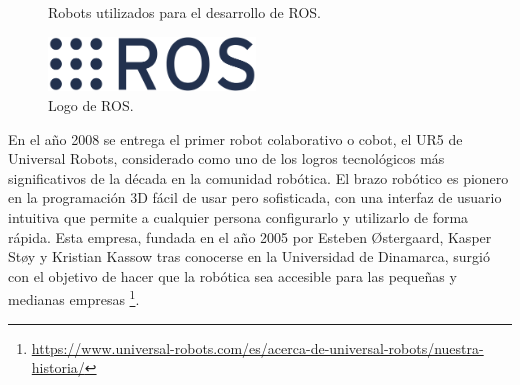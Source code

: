   \begin{figure}[h!]
    \begin{center}
      \subcapcentertrue
      \hspace{2mm}
    \end{center}
    \caption{Robots utilizados para el desarrollo de ROS.}
    \label{fig:PR_ROS}
  \end{figure}
  
  
  \begin{figure} [h!]
    \begin{center}
      \includegraphics[width=55mm]{figs/ROS_logo.png}
    \end{center}
    \caption{Logo de ROS.}
    \label{fig:ROS}
  \end{figure}
  
  \pagebreak
  
En el año 2008 se entrega el primer robot colaborativo o cobot, el UR5 de Universal Robots, considerado como uno de los logros tecnológicos más significativos de la década en la comunidad robótica. El brazo robótico es pionero en la programación 3D fácil de usar pero sofisticada, con una interfaz de usuario intuitiva que permite a cualquier persona configurarlo y utilizarlo de forma rápida. Esta empresa, fundada en el año 2005 por Esteben Østergaard, Kasper Støy y Kristian Kassow tras conocerse en la Universidad de Dinamarca, surgió con el objetivo de hacer que la robótica sea accesible para las pequeñas y medianas empresas \footnote{\url{https://www.universal-robots.com/es/acerca-de-universal-robots/nuestra-historia/}}.\\
  
